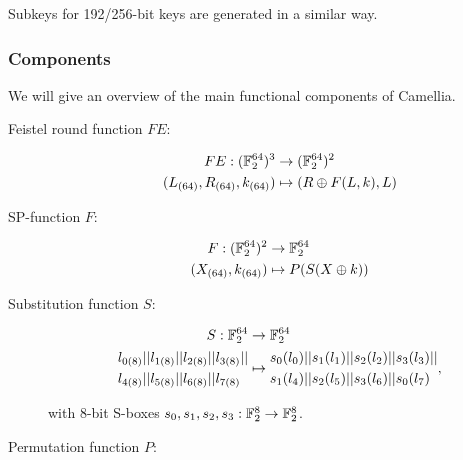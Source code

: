 Subkeys for 192/256-bit keys are generated in a similar way.

\subsubsection{Components}

We will give an overview of the main functional components of Camellia.

\begin{description}
\item[Feistel round function $FE$:]

\begin{align*}
    FE:(\mathbb{F}_2^{64})^3 &\rightarrow (\mathbb{F}_2^{64})^2 \\
    (L_{(64)},R_{(64)},k_{(64)})&\mapsto (R\oplus F(L,k), L)
\end{align*}

\item[SP-function $F$:]

\begin{align*}
    F:(\mathbb{F}_2^{64})^2 &\rightarrow \mathbb{F}_2^{64} \\
    (X_{(64)},k_{(64)})&\mapsto P(S(X\oplus k))
\end{align*}

\item[Substitution function $S$:]

\begin{align*}
    S:\mathbb{F}_2^{64} &\rightarrow \mathbb{F}_2^{64} \\
    \begin{aligned}
        l_{0(8)}||l_{1(8)}||l_{2(8)}||l_{3(8)}&||\\
        l_{4(8)}||l_{5(8)}||l_{6(8)}||l_{7(8)}&
    \end{aligned}&\mapsto
    \begin{aligned}
        s_0(l_0)||s_1(l_1)||s_2(l_2)||s_3(l_3)&||\\
        s_1(l_4)||s_2(l_5)||s_3(l_6)||s_0(l_7)&
    \end{aligned},
\end{align*}

with 8-bit S-boxes $s_0,s_1,s_2,s_3:\mathbb{F}_2^{8}\rightarrow \mathbb{F}_2^{8}$.

\item[Permutation function $P$:]


\end{description}
